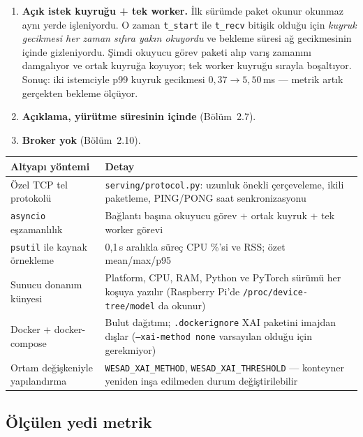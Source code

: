 \documentclass[11pt,a4paper]{article}
\newcommand{\ms}{\,ms}
\newcommand{\kod}[1]{\texttt{\small #1}}
\newcommand{\dosya}[1]{\texttt{\footnotesize #1}}
\begin{document}
\begin{enumerate}[leftmargin=1.5em,itemsep=0.3em]

\item \textbf{Açık istek kuyruğu + tek worker.} İlk sürümde paket okunur
okunmaz aynı yerde işleniyordu. O zaman \kod{t\_start} ile \kod{t\_recv}
bitişik olduğu için \emph{kuyruk gecikmesi her zaman sıfıra yakın okuyordu} ve
bekleme süresi ağ gecikmesinin içinde gizleniyordu. Şimdi okuyucu görev paketi
alıp varış zamanını damgalıyor ve ortak kuyruğa koyuyor; tek worker kuyruğu
sırayla boşaltıyor. Sonuç: iki istemciyle p99 kuyruk gecikmesi
$0{,}37 \rightarrow 5{,}50$\ms{} --- metrik artık gerçekten bekleme ölçüyor.

\item \textbf{Açıklama, yürütme süresinin içinde} (Bölüm~2.7).

\item \textbf{Broker yok} (Bölüm~2.10).
\end{enumerate}

\begin{table}[H]
\centering\small
\begin{tabular}{@{}p{4.0cm}p{10.5cm}@{}}
\toprule
\textbf{Altyapı yöntemi} & \textbf{Detay} \\
\midrule
Özel TCP tel protokolü & \dosya{serving/protocol.py}: uzunluk önekli
çerçeveleme, ikili paketleme, PING/PONG saat senkronizasyonu \\
\kod{asyncio} eşzamanlılık & Bağlantı başına okuyucu görev + ortak kuyruk +
tek worker görevi \\
\kod{psutil} ile kaynak örnekleme & 0{,}1\,s aralıkla süreç CPU \%'si ve RSS;
özet mean/max/p95 \\
Sunucu donanım künyesi & Platform, CPU, RAM, Python ve PyTorch sürümü her
koşuya yazılır (Raspberry Pi'de \kod{/proc/device-tree/model} da okunur) \\
Docker + docker-compose & Bulut dağıtımı; \kod{.dockerignore} XAI paketini
imajdan dışlar (\kod{--xai-method none} varsayılan olduğu için gerekmiyor) \\
Ortam değişkeniyle yapılandırma & \kod{WESAD\_XAI\_METHOD},
\kod{WESAD\_XAI\_THRESHOLD} --- konteyner yeniden inşa edilmeden durum
değiştirilebilir \\
\bottomrule
\end{tabular}
\end{table}

\subsection{Ölçülen yedi metrik}
\end{document}

